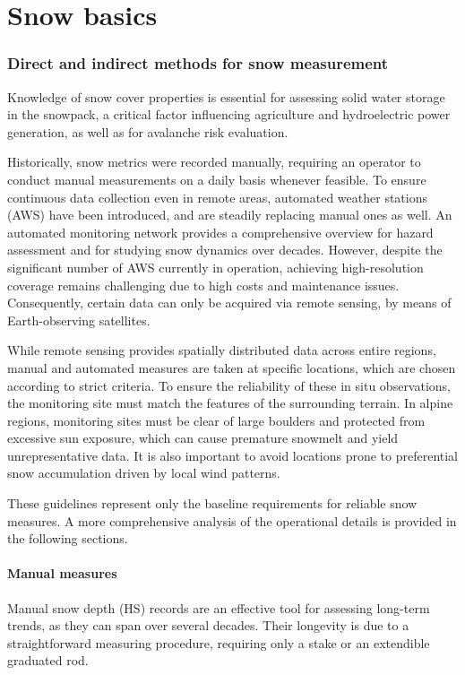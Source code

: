 \chapter{Snow basics}

\subsection{Direct and indirect methods for snow measurement}
Knowledge of snow cover properties is essential for assessing solid water storage in the snowpack, a critical factor influencing 
agriculture and hydroelectric power generation, as well as for avalanche risk evaluation. 

Historically, snow metrics were recorded manually, requiring an operator to conduct manual measurements on a daily basis whenever feasible. 
To ensure continuous data collection even in remote areas, automated weather stations (AWS) have been introduced, and are steadily 
replacing manual ones as well. An automated monitoring network provides a comprehensive overview for hazard assessment and for studying 
snow dynamics over decades. However, despite the significant number of AWS currently in operation, achieving high-resolution coverage 
remains challenging due to high costs and maintenance issues. Consequently, certain data can only be acquired via remote sensing, 
by means of Earth-observing satellites.

While remote sensing provides spatially distributed data across entire regions, manual and automated measures are taken at specific locations, 
which are chosen according to strict criteria. To ensure the reliability of these in situ observations, the monitoring site must match the 
features of the surrounding terrain. In alpine regions, monitoring sites must be clear of large boulders and protected from excessive sun 
exposure, which can cause premature snowmelt and yield unrepresentative data. It is also important to avoid locations prone to preferential 
snow accumulation driven by local wind patterns.

These guidelines represent only the baseline requirements for reliable snow measures. A more comprehensive analysis of the operational details 
is provided in the following sections.


\subsubsection{Manual measures}

Manual snow depth (HS) records are an effective tool for assessing long-term trends, as they can span over several decades. Their longevity is 
due to a straightforward measuring procedure, requiring only a stake or an extendible graduated rod. 

